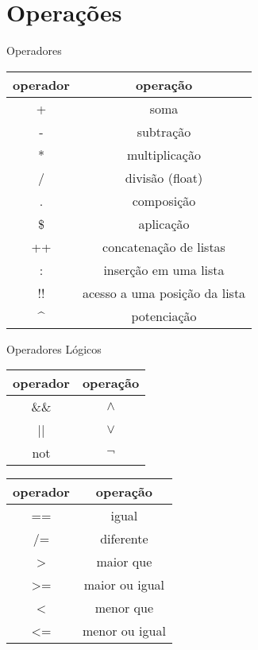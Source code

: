 \documentclass{beamer}
\begin{document}
	\section{Operações}
	\begin{frame}{Operadores}
	 \begin{table}[h]
	  \centering
	  \begin{tabular}{c | c}
			operador & operação\\
			\hline
			+ & soma \\
			- & subtração \\
			* & multiplicação\\
			/ & divisão (float)\\
			. & composição \\
			\$ & aplicação \\
			++ & concatenação de listas\\
			: & inserção em uma lista\\
			!! & acesso a uma posição da lista\\
			\textasciicircum & potenciação\\
	  \end{tabular}
	 \end{table}	 
	\end{frame}
	
	\begin{frame}{Operadores Lógicos}
	 
	 \begin{table}[h]
	  \begin{tabular}{c | c}
	   operador & operação\\
	   \hline
	   \&\& & $\land$ \\
	   || & $\lor$ \\
	   not & $\lnot$ \\
	  \end{tabular}
	 \end{table}
	 
	 \begin{table}[h]
	  \begin{tabular}{c | c}
	   operador & operação\\
	   \hline
	   == & igual \\
	   /= & diferente \\
	   > & maior que \\
	   >= & maior ou igual \\
	   < & menor que \\
	   <= & menor ou igual \\
	  \end{tabular}
	 \end{table} 
	\end{frame}
	
\end{document}

